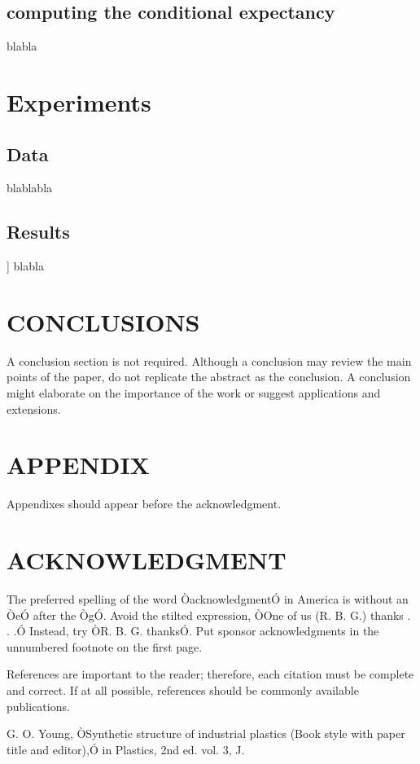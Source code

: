 \documentclass[12pt]{article}
\begin{document}
	\subsection{computing the conditional expectancy}
	blabla
	
	\section{Experiments}
	
	\subsection{Data}
	
	blablabla
	
	\subsection{Results}]
	blabla
	\section{CONCLUSIONS}
	
	A conclusion section is not required. Although a conclusion may review the main points of the paper, do not replicate the abstract as the conclusion. A conclusion might elaborate on the importance of the work or suggest applications and extensions. 
	
	\addtolength{\textheight}{-12cm}  
	
	
	\section*{APPENDIX}
	
	Appendixes should appear before the acknowledgment.
	
	\section*{ACKNOWLEDGMENT}
	
	The preferred spelling of the word ÒacknowledgmentÓ in America is without an ÒeÓ after the ÒgÓ. Avoid the stilted expression, ÒOne of us (R. B. G.) thanks . . .Ó  Instead, try ÒR. B. G. thanksÓ. Put sponsor acknowledgments in the unnumbered footnote on the first page.
	
	
	
	References are important to the reader; therefore, each citation must be complete and correct. If at all possible, references should be commonly available publications.
	
	
	
	\begin{thebibliography}{99}
		
		 G. O. Young, ÒSynthetic structure of industrial plastics (Book style with paper title and editor),Ó 	in Plastics, 2nd ed. vol. 3, J.
		
	\end{thebibliography}
	
	
	
	
\end{document}
